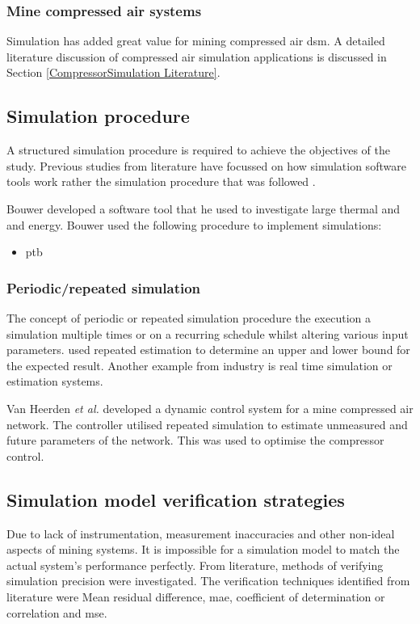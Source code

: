 	\subsubsection{Mine compressed air systems}		
	Simulation has added great value for mining compressed air \gls{dsm}. A detailed literature discussion of compressed air simulation applications is discussed in Section  \ref{CompressorSimulation Literature}.
	\subsection{Simulation procedure}
	A structured simulation procedure is required to achieve the objectives of the study.  Previous studies from literature have focussed on how simulation software tools work rather the simulation procedure that was followed \cite{Mare2016PhD}.
	\par
	Bouwer \cite{bouwer2004designing} developed a software tool that he used to investigate large thermal and and energy. Bouwer used the following procedure to implement simulations:
	\begin{itemize}
		\item \gls{ptb}
	\end{itemize}
	
	\subsubsection{Periodic/repeated simulation}
	The concept of periodic or repeated simulation procedure the execution a simulation multiple times or on a recurring schedule whilst altering various input parameters. \cite{Snyman2011Masters} used repeated estimation to determine an upper and lower bound for the expected result. Another example from industry is real time simulation or estimation systems.
	\par 
	Van Heerden \textit{et al.} \cite{van2014developing} developed a dynamic control system for a mine compressed air network. The controller utilised repeated simulation to estimate unmeasured and future parameters of the network. This was used to optimise the compressor control.
 	\subsection{Simulation model verification strategies}\label{VerificationLit}
 	Due to lack of instrumentation, measurement inaccuracies and other non-ideal aspects of mining systems. It is impossible for a simulation model to match the actual system's performance perfectly. From literature, methods of verifying simulation precision were investigated. The verification techniques identified from literature were Mean residual difference, \gls{mae}, coefficient of determination or correlation and \gls{mse}.%
